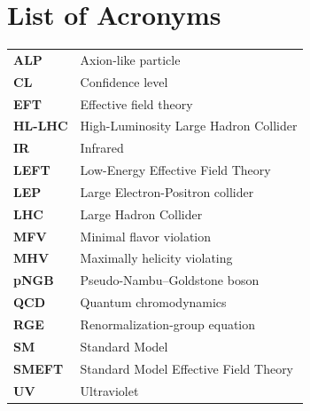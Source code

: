 \chapter*{List of Acronyms}

\noindent
\renewcommand{\arraystretch}{1.25}
\begin{tabular}{@{}l@{\hspace{2.5em}}l@{}}
\textbf{ALP}     & Axion-like particle \\
\textbf{CL}      & Confidence level \\
\textbf{EFT}     & Effective field theory \\
\textbf{HL-LHC}  & High-Luminosity Large Hadron Collider \\
\textbf{IR}      & Infrared \\
\textbf{LEFT}    & Low-Energy Effective Field Theory \\
\textbf{LEP}     & Large Electron-Positron collider \\
\textbf{LHC}     & Large Hadron Collider \\
\textbf{MFV}     & Minimal flavor violation \\
\textbf{MHV}     & Maximally helicity violating \\
\textbf{pNGB}    & Pseudo-Nambu--Goldstone boson \\
\textbf{QCD}     & Quantum chromodynamics \\
\textbf{RGE}     & Renormalization-group equation \\
\textbf{SM}      & Standard Model \\
\textbf{SMEFT}   & Standard Model Effective Field Theory \\
\textbf{UV}      & Ultraviolet \\
\end{tabular}